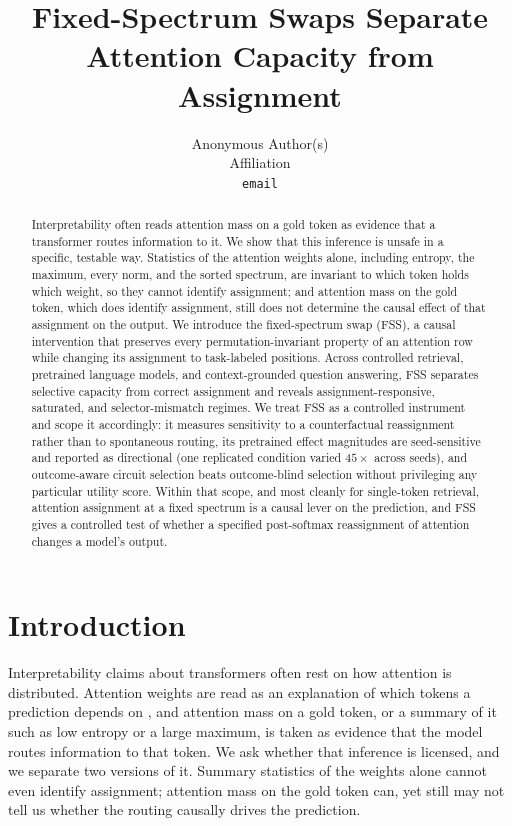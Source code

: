 \documentclass{article}
\title{Fixed-Spectrum Swaps Separate Attention Capacity from Assignment}
\author{%
  Anonymous Author(s)\\
  Affiliation\\
  \texttt{email}
}
\begin{document}
\maketitle

\begin{abstract}
Interpretability often reads attention mass on a gold token as evidence that a transformer routes information
to it. We show that this inference is unsafe in a specific, testable way. Statistics of the attention weights
alone, including entropy, the maximum, every norm, and the sorted spectrum, are invariant to which token holds
which weight, so they cannot identify assignment; and attention mass on the gold token, which does identify
assignment, still does not determine the causal effect of that assignment on the output. We introduce the
fixed-spectrum swap (FSS), a causal intervention that preserves every permutation-invariant property of an
attention row while changing its assignment to task-labeled positions. Across controlled retrieval, pretrained
language models, and context-grounded question answering, FSS separates selective capacity from correct
assignment and reveals assignment-responsive, saturated, and selector-mismatch regimes. We treat FSS as a
controlled instrument and scope it accordingly: it measures sensitivity to a counterfactual reassignment rather
than to spontaneous routing, its pretrained effect magnitudes are seed-sensitive and reported as directional
(one replicated condition varied $45\times$ across seeds), and outcome-aware circuit selection beats
outcome-blind selection without privileging any particular utility score. Within that scope, and most cleanly
for single-token retrieval, attention assignment at a fixed spectrum is a causal lever on the prediction, and
FSS gives a controlled test of whether a specified post-softmax reassignment of attention changes a model's
output.
\end{abstract}

\section{Introduction}

Interpretability claims about transformers often rest on how attention is distributed. Attention weights are
read as an explanation of which tokens a prediction depends on
\citep{jainwallace2019,wiegreffepinter2019}, and attention mass on a gold token, or a summary of it such as
low entropy or a large maximum, is taken as evidence that the model routes information to that token. We ask
whether that inference is licensed, and we separate two versions of it. Summary statistics of the weights
alone cannot even identify assignment; attention mass on the gold token can, yet still may not tell us whether
the routing causally drives the prediction.
\end{document}
